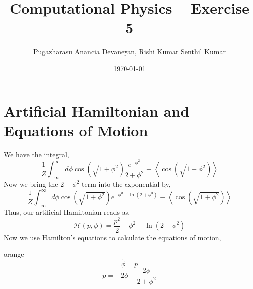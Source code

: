 \documentclass{cernatsnote}
\title{Computational Physics – Exercise 5}
\author{Pugazharasu Anancia Devaneyan, Rishi Kumar Senthil Kumar}
\date{\today}
\begin{document}
\maketitle




\section{Artificial Hamiltonian and Equations of Motion}
We have the integral,
\begin{equation}
    \frac{1}{Z} \int_{-\infty}^{\infty} d \phi \cos \left(\sqrt{1+\phi^2}\right) \frac{e^{-\phi^2}}{2+\phi^2} \equiv\left\langle\cos \left(\sqrt{1+\phi^2}\right)\right\rangle
\end{equation}
Now we bring the $2 + \phi^{2}$ term into the exponential by,
\begin{equation}
    \frac{1}{Z} \int_{-\infty}^{\infty} d \phi \cos \left(\sqrt{1+\phi^2}\right) e^{-\phi^2 - \ln{(2+\phi^2)}} \equiv\left\langle\cos \left(\sqrt{1+\phi^2}\right)\right\rangle
\end{equation}
Thus, our artificial Hamiltonian reads as,
\begin{equation}
    \mathcal{H}(p, \phi) = \frac{p^2}{2} + \phi^{2} + \ln{(2 + \phi^2)}
\end{equation}
Now we use Hamilton's equations to calculate the equations of motion,
\begin{mybox}{orange}{}
\begin{equation}
    \dot{\phi} = p
\end{equation}
\begin{equation}
    \dot{p} = -2 \phi - \frac{2 \phi}{2 + \phi^2}
\end{equation}
\end{mybox}
\end{document}
